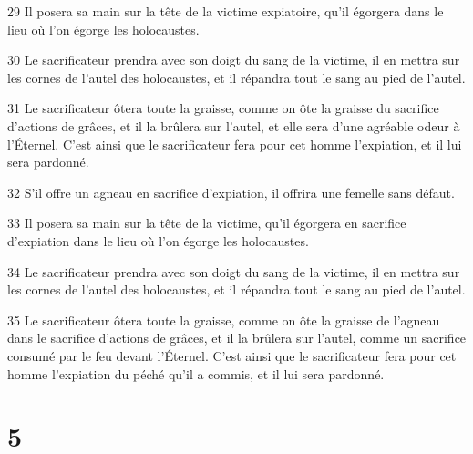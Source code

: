 \par 29 Il posera sa main sur la tête de la victime expiatoire, qu'il égorgera dans le lieu où l'on égorge les holocaustes.
\par 30 Le sacrificateur prendra avec son doigt du sang de la victime, il en mettra sur les cornes de l'autel des holocaustes, et il répandra tout le sang au pied de l'autel.
\par 31 Le sacrificateur ôtera toute la graisse, comme on ôte la graisse du sacrifice d'actions de grâces, et il la brûlera sur l'autel, et elle sera d'une agréable odeur à l'Éternel. C'est ainsi que le sacrificateur fera pour cet homme l'expiation, et il lui sera pardonné.
\par 32 S'il offre un agneau en sacrifice d'expiation, il offrira une femelle sans défaut.
\par 33 Il posera sa main sur la tête de la victime, qu'il égorgera en sacrifice d'expiation dans le lieu où l'on égorge les holocaustes.
\par 34 Le sacrificateur prendra avec son doigt du sang de la victime, il en mettra sur les cornes de l'autel des holocaustes, et il répandra tout le sang au pied de l'autel.
\par 35 Le sacrificateur ôtera toute la graisse, comme on ôte la graisse de l'agneau dans le sacrifice d'actions de grâces, et il la brûlera sur l'autel, comme un sacrifice consumé par le feu devant l'Éternel. C'est ainsi que le sacrificateur fera pour cet homme l'expiation du péché qu'il a commis, et il lui sera pardonné.

\chapter{5}

